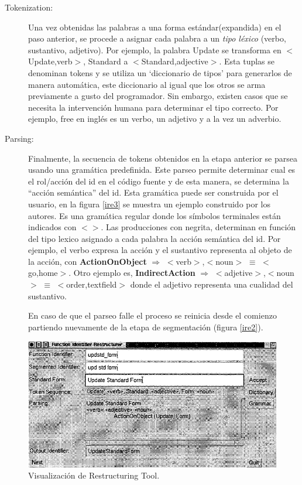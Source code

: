 \documentclass[a4paper,12pt]{report}
\begin{document}
\begin{description}
\item[Tokenization:] Una vez obtenidas las palabras a una forma estándar(expandida) en el paso anterior, se procede a asignar cada palabra a un \textit{tipo léxico} (verbo, sustantivo, adjetivo). Por ejemplo, la palabra \textsf{Update} se transforma en $<$Update,verb$>$, \textsf{Standard} a $<$Standard,adjective$>$. Esta tuplas se denominan tokens y se utiliza un `diccionario de tipos' para generarlos de manera automática, este diccionario al igual que los otros se arma previamente a gusto del programador\cite{BCPT99}. Sin embargo, existen casos que se necesita la intervención humana para determinar el tipo correcto. Por ejemplo, \textsf{free} en inglés es un verbo, un adjetivo y a la vez un adverbio.%

\item[Parsing:] Finalmente, la secuencia de tokens obtenidos en la etapa anterior se parsea usando una gramática predefinida. Este parseo permite determinar cual es el rol/acción del id en el código fuente y de esta manera, se determina la “acción semántica” del id. Esta gramática puede ser construida por el usuario, en la figura \ref{ire3} se muestra un ejemplo construido por los autores. Es una gramática regular donde los símbolos terminales están indicados con $<>$. Las producciones con negrita, determinan en función del tipo lexico asignado a cada palabra la acción semántica del id.
Por ejemplo, el verbo expresa la acción y el sustantivo representa al objeto de la acción, con \textbf{ActionOnObject} $\Rightarrow$ $<$verb$>$,$<$noun$>$ $\equiv$ $<$go,home$>$. Otro ejemplo es, \textbf{IndirectAction} $\Rightarrow$ $<$adjetive$>$,$<$noun$>$ $\equiv$ $<$order,textfield$>$ donde el adjetivo representa una cualidad del sustantivo.

En caso de que el parseo falle el proceso se reinicia desde el comienzo partiendo nuevamente de la etapa de segmentación\cite{BCPT00} (figura \ref{ire2}).
\end{description}

\begin{figure}[ht] %
\centering
\includegraphics[scale= 0.67]{./ire_4.png}
\caption{Visualización de Restructuring Tool.}
\label{ire4}
\end{figure}
\end{document}
